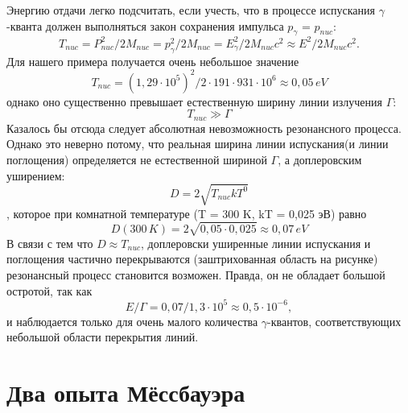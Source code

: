 \documentclass{article}
\begin{document}
\indent Энергию отдачи легко подсчитать, если учесть, что в процессе испускания $\gamma$-кванта должен выполняться закон сохранения импульса $p_{\gamma}$ = $p_{nuc}$:
$$ T_{nuc} = P_{nuc}^{2}/2M_{nuc} = p_{\gamma}^{2}/2M_{nuc} = E_{\gamma}^{2}/2M_{nuc}c^{2} \approx E^{2}/2M_{nuc}c^{2}.$$
\indent Для нашего примера получается очень небольшое значение
$$ T_{nuc} = (1,29\cdot 10^{5})^2/2\cdot 191 \cdot 931 \cdot 10^{6} \approx 0,05 \hspace{2pt}eV$$
однако оно существенно превышает естественную ширину линии излучения $\Gamma$:
$$ T_{nuc} \gg \Gamma $$
\indent Казалось бы отсюда следует абсолютная невозможность резонансного процесса. Однако это неверно потому, что реальная ширина линии испускания(и линии поглощения) определяется не естественной шириной $\Gamma$, а доплеровским уширением:
$$ D = 2\sqrt{T_{nuc}kT^0}$$,
которое при комнатной температуре (T = 300 K, kT = 0,025 эВ) равно
$$ D(300 \hspace{2pt}K) = 2\sqrt{0,05\cdot 0,025} \approx 0,07 \hspace{2pt} eV$$
\indent В связи с тем что $D \approx T_{nuc}$, доплеровски уширенные линии испускания и поглощения частично перекрываются (заштрихованная область на рисунке)  резонансный процесс становится возможен. Правда, он не обладает большой остротой, так как
$$ E/\Gamma = 0,07/1,3 \cdot 10^{5} \approx 0,5 \cdot 10^{-6},$$
и наблюдается только для очень малого количества $\gamma$-квантов, соответствующих небольшой области перекрытия линий.

\section{Два опыта Мёссбауэра}
\end{document}
